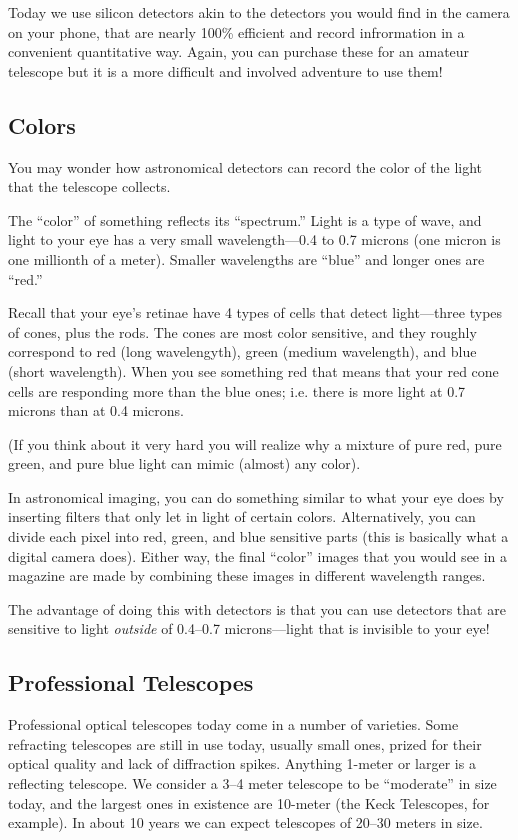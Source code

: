 \documentclass[12pt, preprint]{aastex}
\begin{document}
Today we use silicon detectors akin to the detectors you would find
in the camera on your phone, that are nearly 100\% efficient and
record infrormation in a convenient quantitative way. Again, you can
purchase these for an amateur telescope but it is a more difficult and
involved adventure to use them!

\subsection{Colors}

You may wonder how astronomical detectors can record the color of the
light that the telescope collects.

The ``color'' of something reflects its ``spectrum.'' Light is a type
of wave, and light to your eye has a very small wavelength---0.4 to
0.7 microns (one micron is one millionth of a meter). Smaller
wavelengths are ``blue'' and longer ones are ``red.''

Recall that your eye's retinae have 4 types of cells that detect
light---three types of cones, plus the rods. The cones are most color
sensitive, and they roughly correspond to red (long wavelengyth),
green (medium wavelength), and blue (short wavelength). When you see
something red that means that your red cone cells are responding more
than the blue ones; i.e. there is more light at 0.7 microns than at
0.4 microns.

(If you think about it very hard you will realize why a mixture of pure
red, pure green, and pure blue light can mimic (almost) any color).

In astronomical imaging, you can do something similar to what your eye
does by inserting filters that only let in light of certain
colors. Alternatively, you can divide each pixel into red, green, and
blue sensitive parts (this is basically what a digital camera
does). Either way, the final ``color'' images that you would see in a
magazine are made by combining these images in different wavelength
ranges.

The advantage of doing this with detectors is that you can use
detectors that are sensitive to light {\it outside} of 0.4--0.7
microns---light that is invisible to your eye!

\subsection{Professional Telescopes}

Professional optical telescopes today come in a number of
varieties. Some refracting telescopes are still in use today, usually
small ones, prized for their optical quality and lack of diffraction
spikes. Anything 1-meter or larger is a reflecting telescope. We
consider a 3--4 meter telescope to be ``moderate'' in size today, and
the largest ones in existence are 10-meter (the Keck Telescopes, for
example). In about 10 years we can expect telescopes of 20--30 meters
in size.
\end{document}
